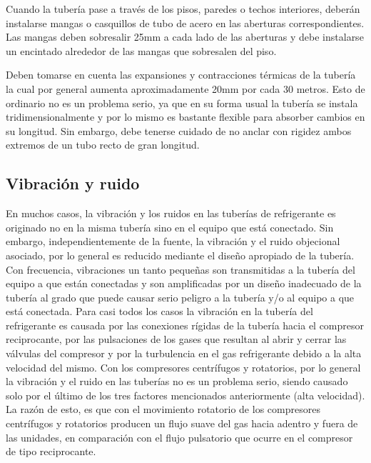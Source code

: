 	Cuando la tubería pase a través de los pisos, paredes o techos interiores, deberán instalarse mangas o casquillos de tubo de acero en las aberturas correspondientes. Las mangas deben sobresalir 25mm a cada lado de las aberturas y debe instalarse un encintado alrededor de las mangas que sobresalen del piso.

	Deben tomarse en cuenta las expansiones y contracciones térmicas de la tubería la cual por general aumenta aproximadamente 20mm por cada 30 metros. Esto de ordinario no es un problema serio, ya que en su forma usual la tubería se instala tridimensionalmente y por lo mismo es bastante flexible para absorber cambios en su longitud. Sin embargo, debe tenerse cuidado de no anclar con rigidez ambos extremos de un tubo recto de gran longitud.

	\subsection{Vibración y ruido}

	En muchos casos, la vibración y los ruidos en las tuberías de refrigerante es originado no en la misma tubería sino en el equipo que está conectado. Sin embargo, independientemente de la fuente, la vibración y el ruido objecional asociado, por lo general es reducido mediante el diseño apropiado de la tubería. Con frecuencia, vibraciones un tanto pequeñas son transmitidas a la tubería del equipo a que están conectadas y son amplificadas por un diseño inadecuado de la tubería al grado que puede causar serio peligro a la tubería y/o al equipo a que está conectada. Para casi todos los casos la vibración en la tubería del refrigerante es causada por las conexiones rígidas de la tubería hacia el compresor reciprocante, por las pulsaciones de los gases que resultan al abrir y cerrar las válvulas del compresor y por la turbulencia en el gas refrigerante debido a la alta velocidad del mismo. Con los compresores centrífugos y rotatorios, por lo general la vibración y el ruido en las tuberías no es un problema serio, siendo causado solo por el último de los tres factores mencionados anteriormente (alta velocidad). La razón de esto, es que con el movimiento rotatorio de los compresores centrífugos y rotatorios producen un flujo suave del gas hacia adentro y fuera de las unidades, en comparación con el flujo pulsatorio que ocurre en el compresor de tipo reciprocante.

